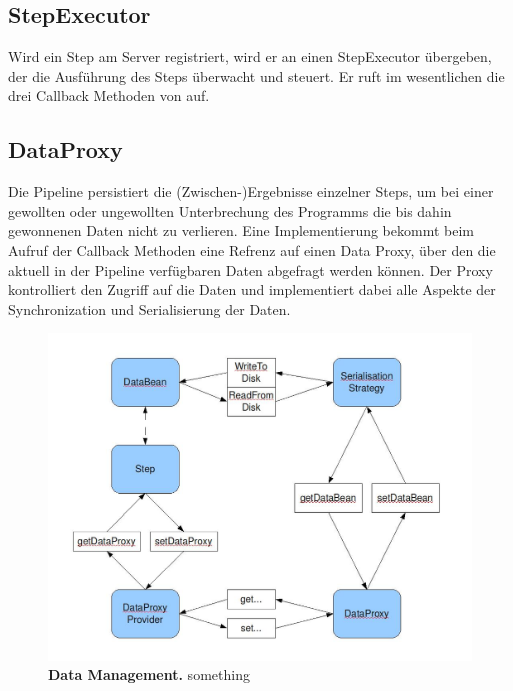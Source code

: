 \subsection{StepExecutor}
Wird ein Step am Server registriert, wird er an einen StepExecutor übergeben,
der die Ausführung des Steps überwacht und steuert. Er ruft im wesentlichen
die drei Callback Methoden von  auf.


\subsection{DataProxy}
Die Pipeline persistiert die (Zwischen-)Ergebnisse einzelner Steps, um bei
einer gewollten oder ungewollten Unterbrechung des Programms die bis dahin
gewonnenen Daten nicht zu verlieren. Eine  Implementierung bekommt
beim Aufruf der Callback Methoden eine Refrenz auf einen Data Proxy, über den
die aktuell in der Pipeline verfügbaren Daten abgefragt werden können. Der
Proxy kontrolliert den Zugriff auf die Daten und implementiert dabei alle
Aspekte der Synchronization und Serialisierung der Daten.

\begin{figure}[ht]
	\begin{center}
		\includegraphics[scale=0.42]{pics/programDataManagment.jpg}
	\caption[Data Management]{
	\textbf{Data Management.}
	something}
	\end{center}
	\label{fig:programDataManagment}
\end{figure}







